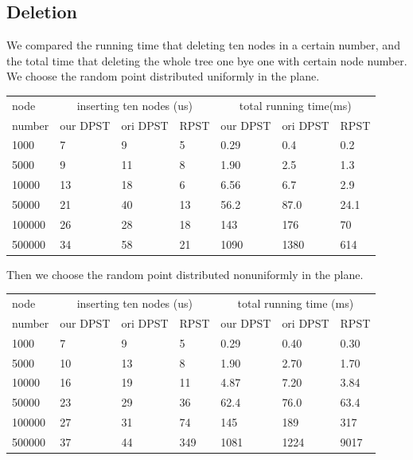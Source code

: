 \documentclass{acm_proc_article-sp}
\begin{document}
\subsection{Deletion}
We compared the running time that deleting ten nodes in
a certain number, and the total time that deleting the whole tree
one bye one with certain node number.\\
We choose the random point distributed uniformly in the plane.\\

\begin{table}[ht]
\begin{tabular}{|p{1.1cm}|p{0.8cm}|p{0.8cm}|p{0.8cm}|p{0.8cm}|p{0.8cm}|p{0.8cm}|}
\hline node & \multicolumn{3}{|c|}{inserting ten nodes (us)} & \multicolumn{3}{|c|}{total running time(ms)}\\
\cline{2-7}
number & our DPST & ori DPST  & RPST & our DPST & ori DPST & RPST\\
\hline 1000 & 7 & 9 & 5 & 0.29 & 0.4 & 0.2\\
\hline 5000 & 9 & 11 & 8 & 1.90 & 2.5 & 1.3\\
\hline 10000 & 13 & 18 & 6 & 6.56 & 6.7 & 2.9\\
\hline 50000 & 21 & 40 & 13 & 56.2 & 87.0 & 24.1\\
\hline 100000 & 26 & 28 & 18 & 143 & 176& 70\\
\hline 500000 & 34 & 58 & 21 & 1090 & 1380 & 614\\
\hline
\end{tabular}
\end{table}

Then we choose the random point distributed nonuniformly in the plane.\\

\begin{table}[ht]
\begin{tabular}{|p{1.1cm}|p{0.8cm}|p{0.8cm}|p{0.8cm}|p{0.8cm}|p{0.8cm}|p{0.8cm}|}
\hline node & \multicolumn{3}{|c|}{inserting ten nodes (us)} & \multicolumn{3}{|c|}{total running time (ms)}\\
\cline{2-7}
number & our DPST & ori DPST  & RPST & our DPST & ori DPST & RPST\\
\hline 1000 & 7 & 9 & 5 & 0.29 & 0.40 & 0.30\\
\hline 5000 & 10 & 13 & 8 & 1.90 & 2.70 & 1.70\\
\hline 10000 & 16 & 19 & 11 & 4.87 & 7.20 & 3.84\\
\hline 50000 & 23 & 29 & 36 & 62.4 & 76.0 & 63.4\\
\hline 100000 & 27 & 31 & 74 & 145 & 189 & 317\\
\hline 500000 & 37 & 44 & 349 & 1081 & 1224 & 9017\\
\hline
\end{tabular}
\end{table}
\end{document}
